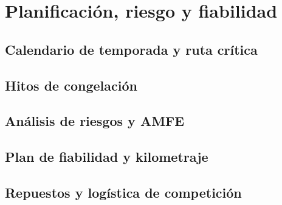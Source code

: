\chapter{Planificación, riesgo y fiabilidad}
\label{ch:planificacion_fiabilidad}

\begin{objetivos}
  \item {}
  \item {}
  \item {}
\end{objetivos}


\section{Calendario de temporada y ruta crítica}
\label{sec:planificacion_fiabilidad:01}

\section{Hitos de congelación}
\label{sec:planificacion_fiabilidad:02}

\section{Análisis de riesgos y AMFE}
\label{sec:planificacion_fiabilidad:03}

\section{Plan de fiabilidad y kilometraje}
\label{sec:planificacion_fiabilidad:04}

\section{Repuestos y logística de competición}
\label{sec:planificacion_fiabilidad:05}

